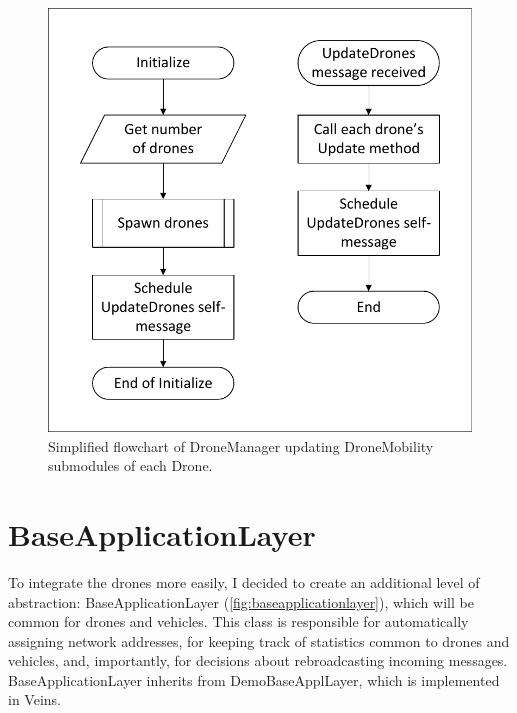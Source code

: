 \documentclass[]{nsm-thesis}
\begin{document}
\begin{figure}
	\centering
	\includegraphics[width=1\textwidth]{figures/DroneManager.pdf}
	\caption{Simplified flowchart of DroneManager updating DroneMobility submodules of each Drone.}
	\label{fig:dronemanagerflow}
\end{figure}



\section{BaseApplicationLayer}

To integrate the drones more easily, I decided to create an additional level of abstraction: BaseApplicationLayer (\cref{fig:baseapplicationlayer}), which will be common for drones and vehicles. This class is responsible for automatically assigning network addresses, for keeping track of statistics common to drones and vehicles, and, importantly, for decisions about rebroadcasting incoming messages. BaseApplicationLayer inherits from DemoBaseApplLayer, which is implemented in Veins.
\end{document}
